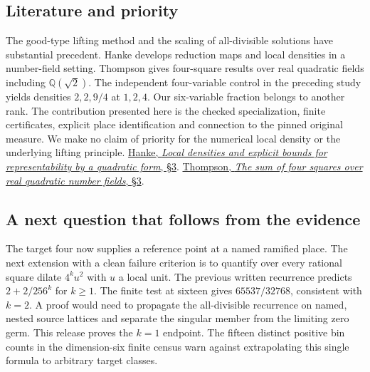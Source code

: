 \documentclass[12pt,letterpaper]{article}
\begin{document}
\subsection{Literature and priority}
The good-type lifting method and the scaling of all-divisible solutions have substantial precedent. Hanke develops reduction maps and local densities in a number-field setting. Thompson gives four-square results over real quadratic fields including $\mathbb Q(\sqrt2)$. The independent four-variable control in the preceding study yields densities $2,2,9/4$ at $1,2,4$. Our six-variable fraction belongs to another rank. The contribution presented here is the checked specialization, finite certificates, explicit place identification and connection to the pinned original measure. We make no claim of priority for the numerical local density or the underlying lifting principle. \href{https://www.jonhanke.com/Hanke--all_papers__as_of_2015-01-14/explicit-bounds-paper.pdf}{Hanke, \emph{Local densities and explicit bounds for representability by a quadratic form}, §3}. \href{https://arxiv.org/abs/1610.06935}{Thompson, \emph{The sum of four squares over real quadratic number fields}, §3}.
\subsection{A next question that follows from the evidence}
The target four now supplies a reference point at a named ramified place. The next extension with a clean failure criterion is to quantify over every rational square dilate $4^k u^2$ with $u$ a local unit. The previous written recurrence predicts $2+2/256^k$ for $k\ge1$. The finite test at sixteen gives $65537/32768$, consistent with $k=2$. A proof would need to propagate the all-divisible recurrence on named, nested source lattices and separate the singular member from the limiting zero germ. This release proves the $k=1$ endpoint. The fifteen distinct positive bin counts in the dimension-six finite census warn against extrapolating this single formula to arbitrary target classes.
\end{document}
